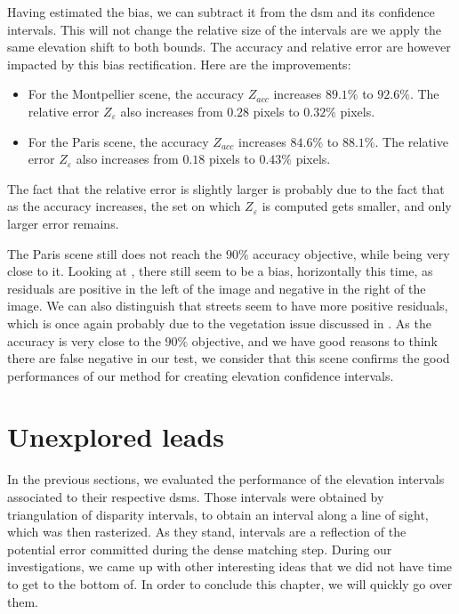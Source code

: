 Having estimated the bias, we can subtract it from the \acrshort{dsm} and its confidence intervals. This will not change the relative size of the intervals are we apply the same elevation shift to both bounds. The accuracy and relative error are however impacted by this bias rectification. Here are the improvements:
\begin{itemize}
    \item For the Montpellier scene, the accuracy $Z_{acc}$ increases $89.1\%$ to $92.6\%$. The relative error $Z_\varepsilon$ also increases from $0.28$ pixels to $0.32\%$ pixels.
    \item For the Paris scene, the accuracy $Z_{acc}$ increases $84.6\%$ to $88.1\%$. The relative error $Z_\varepsilon$ also increases from $0.18$ pixels to $0.43\%$ pixels.  
\end{itemize}
The fact that the relative error is slightly larger is probably due to the fact that as the accuracy increases, the set on which $Z_\varepsilon$ is computed gets smaller, and only larger error remains. 

The Paris scene still does not reach the $90\%$ accuracy objective, while being very close to it. Looking at , there still seem to be a bias, horizontally this time, as residuals are positive in the left of the image and negative in the right of the image. We can also distinguish that streets seem to have more positive residuals, which is once again probably due to the vegetation issue discussed in . As the accuracy is very close to the $90\%$ objective, and we have good reasons to think there are false negative in our test, we consider that this scene confirms the good performances of our method for creating elevation confidence intervals. 

\section{Unexplored leads}\label{sec:unexplored_leads}
In the previous sections, we evaluated the performance of the elevation intervals associated to their respective \acrshort{dsm}s. Those intervals were obtained by triangulation of disparity intervals, to obtain an interval along a line of sight, which was then rasterized. As they stand, intervals are a reflection of the potential error committed during the dense matching step. During our investigations, we came up with other interesting ideas that we did not have time to get to the bottom of. In order to conclude this chapter, we will quickly go over them.

